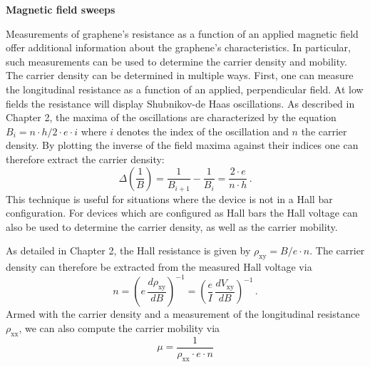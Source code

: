 \documentclass[edeposit,fullpage,draftthesis]{uiucthesis2009}
\begin{document}
            \textbf{Magnetic field sweeps}
            
            Measurements of graphene's resistance as a function of an applied magnetic field offer
            additional information about the graphene's characteristics. In particular, such measurements
            can be used to determine the carrier density and mobility.
            The carrier density can be determined in multiple ways. First, one can measure the
            longitudinal resistance as a function of an applied, perpendicular field. At low fields
            the resistance will display Shubnikov-de Haas oscillations. As described in Chapter 2, the 
            maxima of the oscillations are characterized by the equation $B_i = n \cdot h / 2 \cdot e \cdot i$
            where $i$ denotes the index of the oscillation and $n$ the carrier density. 
            By plotting the inverse of the field maxima against their indices one can therefore extract the carrier density:
            \begin{equation}
                \Delta\left(\frac{1}{B}\right) = \frac{1}{B_{i+1}}-\frac{1}{B_i} = \frac{2 \cdot e}{n\cdot h}\,.
            \end{equation}
            This technique is useful for situations where the device is not in a Hall bar configuration. For
            devices which are configured as Hall bars the Hall voltage can also be used to determine the carrier
            density, as well as the carrier mobility.
            
            As detailed in Chapter 2, the Hall resistance is given by $\rho_\text{xy} = B / e \cdot n$.
            The carrier density can therefore be extracted from the measured Hall voltage via 
            \begin{equation}
                n = \left(e \, \frac{d\rho_\text{xy}}{dB}\right)^{-1} = \left(\frac{e}{I} \, \frac{dV_\text{xy}}{dB}\right)^{-1} \,.
            \end{equation}
            Armed with the carrier density and a measurement of the longitudinal resistance $\rho_\text{xx}$,
            we can also compute the carrier mobility via
            \begin{equation}
                \mu = \frac{1}{\rho_\text{xx} \cdot e \cdot n}
            \end{equation}
            
\end{document}
